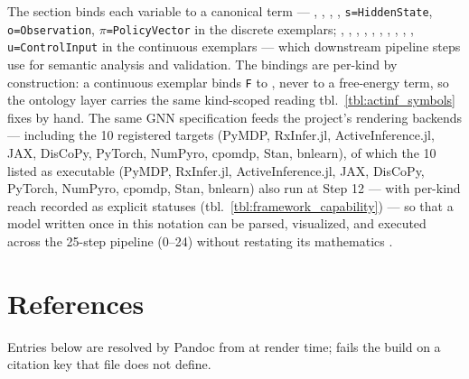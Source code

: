 \documentclass[
  english,
  9pt,
]{extarticle}
\begin{document}
The  section binds each variable
to a canonical term --- ,
, ,
, \texttt{s=HiddenState},
\texttt{o=Observation}, \texttt{\texorpdfstring{\ensuremath{\pi}}{pi}=PolicyVector} in the discrete
exemplars; ,
, ,
, ,
, ,
, ,
, \texttt{u=ControlInput} in the
continuous exemplars --- which downstream pipeline steps use for
semantic analysis and validation. The bindings are per-kind by
construction: a continuous exemplar binds \texttt{F} to
, never to a free-energy term, so the
ontology layer carries the same kind-scoped reading
tbl.~\ref{tbl:actinf_symbols} fixes by hand. The same GNN specification
feeds the project's rendering backends --- including the 10 registered
targets (PyMDP, RxInfer.jl, ActiveInference.jl, JAX, DisCoPy, PyTorch,
NumPyro, cpomdp, Stan, bnlearn), of which the 10 listed as executable
(PyMDP, RxInfer.jl, ActiveInference.jl, JAX, DisCoPy, PyTorch, NumPyro,
cpomdp, Stan, bnlearn) also run at Step 12 --- with per-kind reach
recorded as explicit statuses (tbl.~\ref{tbl:framework_capability}) ---
so that a model written once in this notation can be parsed, visualized,
and executed across the 25-step pipeline (0--24) without restating its
mathematics \citep{gnn2023, heins2022, defelice2021}.

\newpage

\section{References}\label{sec:references}

Entries below are resolved by Pandoc from
\href{references.bib}{} at render
time;  fails the build on a
citation key that file does not define.



\providecommand{\bibsection}{}
\renewcommand{\bibsection}{}


\end{document}
